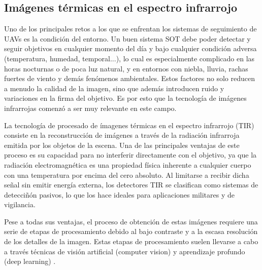 \renewcommand{\abstractname}{Agradecimientos}
\begin{abstract}
Incluir aquí los agradecimientos que se deseen, dedicatoria y cualquier otro texto de carácter personal.

\lipsum[1-2]
\end{abstract}

\subsection{Imágenes térmicas en el espectro infrarrojo}

    Uno de los principales retos a los que se enfrentan los sistemas de seguimiento de UAVs es la condición del entorno. Un buen sistema SOT debe poder detectar y seguir objetivos en cualquier momento del día y bajo cualquier condición adversa (temperatura, humedad, temporal...), lo cual es especialmente complicado en las horas nocturnas o de poca luz natural, y en entornos con niebla, lluvia, rachas fuertes de viento y demás fenómenos ambientales. Estos factores no solo reducen a menudo la calidad de la imagen, sino que además introducen ruido y variaciones en la firma del objetivo. Es por esto que la tecnología de imágenes infrarrojas comenzó a ser muy relevante en este campo.

    La tecnología de procesado de ímagenes térmicas en el espectro infrarrojo (TIR) consiste en la reconstrucción de imágenes a través de la radiación infrarroja emitida por los objetos de la escena. Una de las principales ventajas de este proceso es su capacidad para no interferir directamente con el objetivo, ya que la radiación electromagnética es una propiedad física inherente a cualquier cuerpo con una temperatura por encima del cero absoluto. Al limitarse a recibir dicha señal sin emitir energía externa, los detectores TIR se clasifican como sistemas de detecciñón pasivos, lo que los hace ideales para aplicaciones militares y de vigilancia. 

    Pese a todas sus ventajas, el proceso de obtención de estas imágenes requiere una serie de etapas de procesamiento debido al bajo contraste y a la escasa resolución de los detalles de la imagen. Estas etapas de procesamiento suelen llevarse a cabo a través técnicas de visión artificial (computer vision) y aprendizaje profundo (deep learning) \cite{review_infrared_imaging}.
